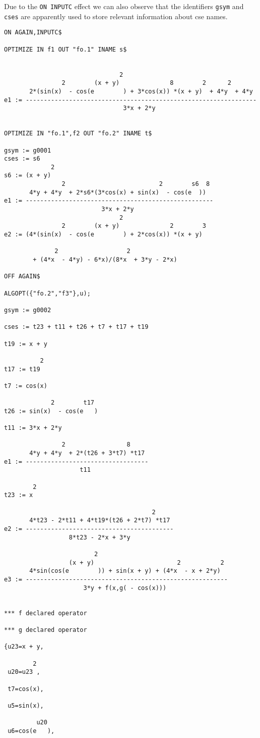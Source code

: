 Due to the {\tt ON INPUTC} effect we can also observe that the identifiers
{\tt gsym} and {\tt cses} are apparently used to store relevant information
about cse names.

{\small
\begin{verbatim}
ON AGAIN,INPUTC$

OPTIMIZE IN f1 OUT "fo.1" INAME s$


                                2
                2        (x + y)              8        2      2
       2*(sin(x)  - cos(e        ) + 3*cos(x)) *(x + y)  + 4*y  + 4*y
e1 := ----------------------------------------------------------------
                                 3*x + 2*y


OPTIMIZE IN "fo.1",f2 OUT "fo.2" INAME t$

gsym := g0001
cses := s6
             2
s6 := (x + y)
                2                          2        s6  8
       4*y + 4*y  + 2*s6*(3*cos(x) + sin(x)  - cos(e  ))
e1 := ----------------------------------------------------
                           3*x + 2*y
                                2
                2        (x + y)              2        3
e2 := (4*(sin(x)  - cos(e        ) + 2*cos(x)) *(x + y)

              2                   2
        + (4*x  - 4*y) - 6*x)/(8*x  + 3*y - 2*x)

OFF AGAIN$

ALGOPT({"fo.2","f3"},u);

gsym := g0002

cses := t23 + t11 + t26 + t7 + t17 + t19

t19 := x + y

          2
t17 := t19

t7 := cos(x)

             2        t17
t26 := sin(x)  - cos(e   )

t11 := 3*x + 2*y

                2                 8
       4*y + 4*y  + 2*(t26 + 3*t7) *t17
e1 := ----------------------------------
                     t11

        2
t23 := x

                                         2
       4*t23 - 2*t11 + 4*t19*(t26 + 2*t7) *t17
e2 := -----------------------------------------
                  8*t23 - 2*x + 3*y

                         2
                  (x + y)                       2           2
       4*sin(cos(e        )) + sin(x + y) + (4*x  - x + 2*y)
e3 := --------------------------------------------------------
                      3*y + f(x,g( - cos(x)))


*** f declared operator

*** g declared operator

{u23=x + y,

        2
 u20=u23 ,

 t7=cos(x),

 u5=sin(x),

         u20
 u6=cos(e   ),

\end{verbatim}}
